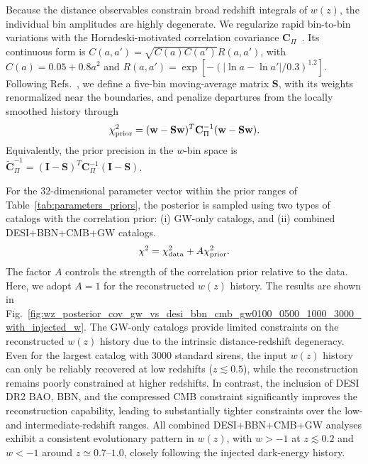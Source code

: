 \documentclass[
  aps,
  prd,
  twocolumn,
  nofootinbib,
  superscriptaddress,
  floatfix,
  longbibliography
]{revtex4-2}
\begin{document}
Because the distance observables constrain broad redshift integrals of
$w(z)$, the individual bin amplitudes are highly degenerate. We regularize
rapid bin-to-bin variations with the Horndeski-motivated correlation
covariance $\mathbf{C}_{\Pi}$~\cite{Raveri2017}. Its continuous form is
$C(a,a')=\sqrt{C(a)C(a')}R(a,a')$, with
$C(a)=0.05+0.8a^2$ and
$R(a,a')=\exp[-(|\ln a-\ln a'|/0.3)^{1.2}]$.
Following Refs.~\cite{Crittenden2012,Zhao_2017,Gu_2025}, we define a
five-bin moving-average matrix $\mathbf{S}$, with its weights renormalized
near the boundaries, and penalize departures from the locally smoothed
history through
\begin{equation}
 \chi^2_{\rm prior}
 =
 (\mathbf{w}-\mathbf{S}\mathbf{w})^{T}
 \mathbf{C}_{\Pi}^{-1}
 (\mathbf{w}-\mathbf{S}\mathbf{w}).
 \label{eq:chi2_prior}
\end{equation}
Equivalently, the prior precision in the $w$-bin space is
$\widetilde{\mathbf{C}}_{\Pi}^{-1}
=(\mathbf{I}-\mathbf{S})^T\mathbf{C}_{\Pi}^{-1}
(\mathbf{I}-\mathbf{S})$.

For the 32-dimensional parameter vector within the prior ranges of
Table~\ref{tab:parameters_priors}, the posterior is sampled using two types of catalogs with the correlation prior: (i) GW-only catalogs, and (ii) combined DESI+BBN+CMB+GW catalogs.
\begin{equation}
 \chi^2
 =
 \chi_{\rm data}^2+A\chi^2_{\rm prior}.
 \label{eq:chi2_total_nonparam}
\end{equation}
The factor $A$ controls the strength of the correlation prior relative to
the data. Here, we adopt $A=1$ for the reconstructed $w(z)$ history. The results are shown in Fig.~\ref{fig:wz_posterior_cov_gw_vs_desi_bbn_cmb_gw0100_0500_1000_3000_with_injected_w}. The GW-only catalogs provide limited constraints on the reconstructed $w(z)$ history due to the intrinsic distance-redshift degeneracy. Even for the largest catalog with 3000 standard sirens, the input $w(z)$ history can only be reliably recovered at low redshifts ($z\lesssim0.5$), while the reconstruction remains poorly constrained at higher redshifts. In contrast, the inclusion of DESI DR2 BAO, BBN, and the compressed CMB constraint significantly improves the reconstruction capability, leading to substantially tighter constraints over the low- and intermediate-redshift ranges.
All combined DESI+BBN+CMB+GW analyses exhibit a consistent evolutionary pattern in $w(z)$, with $w>-1$ at $z\lesssim0.2$ and $w<-1$ around $z\simeq0.7$--$1.0$, closely following the injected dark-energy history.
\end{document}
